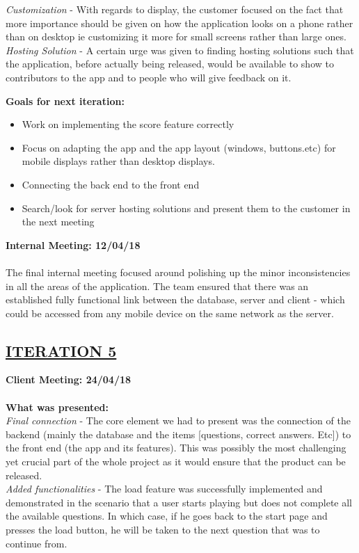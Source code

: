 \documentclass[paper=a4,fontsize=11pt]{article}
\newcommand{\sepspace}{\vspace*{1em}}		%
\newcommand{\SectionPart}[1]{\subsection*{\uppercase{#1}}}
\begin{document}
\noindent
\textit{Customization} -
With regards to display, the customer focused on the fact that more importance should be
given on how the application looks on a phone rather than on desktop ie customizing it more
for small screens rather than large ones.\\

\noindent
\textit{Hosting Solution} -
A certain urge was given to finding hosting solutions such that the application, before
actually being released, would be available to show to contributors to the app and to people
who will give feedback on it.\\
\sepspace

\noindent
\textbf{Goals for next iteration:}
\begin{itemize}
	\item Work on implementing the score feature correctly
	\item Focus on adapting the app and the app layout (windows, buttons.etc) for mobile displays rather than desktop displays.
	\item Connecting the back end to the front end
	\item Search/look for server hosting solutions and present them to the customer in the next meeting
\end{itemize}
\sepspace

\hfill \textbf{Internal Meeting: 12/04/18}\\
\\
\noindent
The final internal meeting focused around polishing up the minor inconsistencies in all the
areas of the application. The team ensured that there was an established fully functional link between
the database, server and client - which could be accessed from any mobile device on the same network
as the server.\\
\sepspace

\SectionPart{\ul{Iteration 5}}
\hfill \textbf{Client Meeting: 24/04/18} \\
\\
\textbf{What was presented:}\\
\noindent
\textit{Final connection} -
The core element we had to present was the connection of the backend (mainly the database
and the items [questions, correct answers. Etc]) to the front end (the app and its features).
This was possibly the most challenging yet crucial part of the whole project as it would
ensure that the product can be released.\\

\noindent
\textit{Added functionalities} -
The load feature was successfully implemented and demonstrated in the scenario that a user
starts playing but does not complete all the available questions. In which case, if he goes back
to the start page and presses the load button, he will be taken to the next question that was to
continue from.\\
\sepspace
\end{document}
